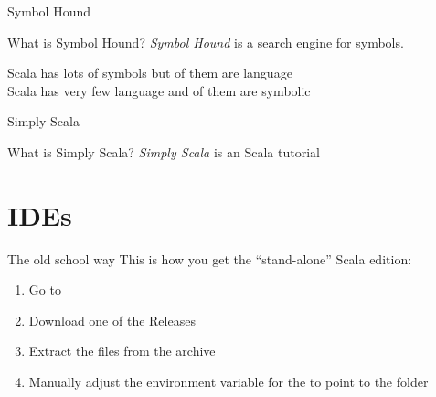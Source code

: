 
\begin{frame}{Symbol Hound}
\begin{center}
\end{center}
\begin{center}
\begin{block}{What is Symbol Hound?}
\emph{Symbol Hound} is a search engine for symbols.
\end{block}
\begin{center}
Scala has lots of \alert{symbols} but  of them are language
\\
Scala has very few language  and  of them
are \alert{symbolic}
\end{center}
\end{center}
\end{frame}

\begin{frame}{Simply Scala}
\begin{center}
\end{center}
\begin{block}{What is Simply Scala?}
\emph{Simply Scala} is an  Scala tutorial
\end{block}
\end{frame}

\section{IDEs}
\begin{frame}{The old school way}
This is how you get the ``stand-alone'' Scala edition:
\begin{enumerate}
  \item Go to
  \item Download one of the  Releases
  \item Extract the files from the archive
  \item Manually adjust the environment variable for the  to
  point to the  folder
\end{enumerate}
\end{frame}

